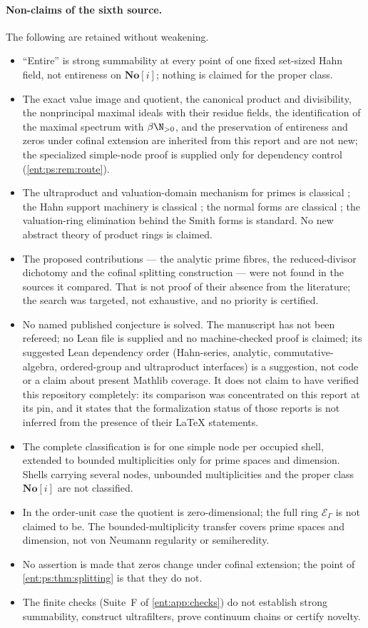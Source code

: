 \documentclass[11pt]{article}
\theoremstyle{plain}
\theoremstyle{plain}
\theoremstyle{plain}
\theoremstyle{definition}
\theoremstyle{definition}
\theoremstyle{definition}
\theoremstyle{definition}
\theoremstyle{remark}
\newcommand{\No}{\mathbf{No}}
\begin{document}
\paragraph{Non-claims of the sixth source.}
The following are retained without weakening.
\begin{itemize}[leftmargin=1.4em]
\item ``Entire'' is strong summability at every point of one fixed set-sized
Hahn field, not entireness on $\No[i]$; nothing is claimed for the proper
class.
\item The exact value image and quotient, the canonical product and
divisibility, the nonprincipal maximal ideals with their residue fields, the
identification of the maximal spectrum with $\beta\N_{>0}$, and the
preservation of entireness and zeros under cofinal extension are inherited
from this report and are not new; the specialized simple-node proof is
supplied only for dependency control (\cref{ent:ps:rem:route}).
\item The ultraproduct and valuation-domain mechanism for primes is classical
\cite{FFW,StacksValuation}; the Hahn support machinery is classical
\cite{Neumann}; the normal forms are classical \cite{Conway,Gonshor}; the
valuation-ring elimination behind the Smith forms is standard. No new abstract
theory of product rings is claimed.
\item The proposed contributions --- the analytic prime fibres, the
reduced-divisor dichotomy and the cofinal splitting construction --- were
not found in the sources it compared. That is not proof of their absence
from the literature; the search was targeted, not exhaustive, and no
priority is certified.
\item No named published conjecture is solved. The manuscript has not been
refereed; no Lean file is supplied and no machine-checked proof is claimed;
its suggested Lean dependency order (Hahn-series, analytic,
commutative-algebra, ordered-group and ultraproduct interfaces) is a
suggestion, not code or a claim about present Mathlib coverage. It does not
claim to have verified this repository completely: its comparison was
concentrated on this report at its pin, and it states that the formalization
status of those reports is not inferred from the presence of their LaTeX
statements.
\item The complete classification is for one simple node per occupied shell,
extended to bounded multiplicities only for prime spaces and dimension. Shells
carrying several nodes, unbounded multiplicities and the proper class
$\No[i]$ are not classified.
\item In the order-unit case the quotient is zero-dimensional; the full ring
$\mathcal E_\Gamma$ is not claimed to be. The bounded-multiplicity transfer
covers prime spaces and dimension, not von Neumann regularity or
semiheredity.
\item No assertion is made that zeros change under cofinal extension; the
point of \cref{ent:ps:thm:splitting} is that they do not.
\item The finite checks (Suite~F of \cref{ent:app:checks}) do not establish
strong summability, construct ultrafilters, prove continuum chains or certify
novelty.
\end{itemize}
\end{document}
